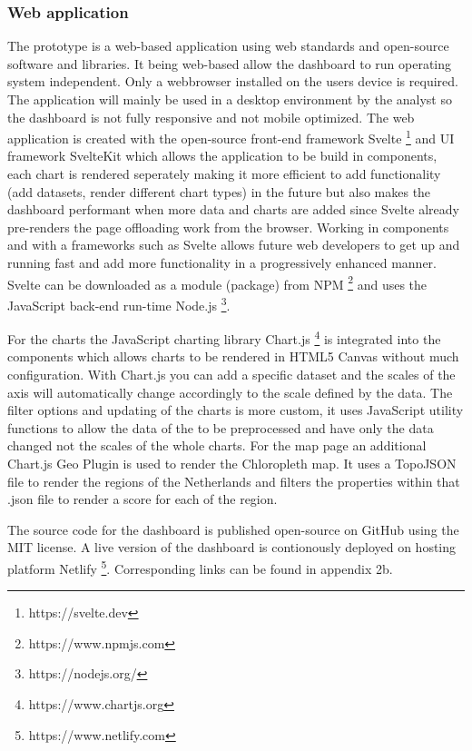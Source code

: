 \subsubsection{Web application}\hfill
The prototype is a web-based application using web standards and open-source software and libraries. It being web-based allow the dashboard to run operating system independent. Only a webbrowser installed on the users device is required. The application will mainly be used in a desktop environment by the analyst so the dashboard is not fully responsive and not mobile optimized. The web application is created with the open-source front-end framework Svelte \footnote{https://svelte.dev} and UI framework SvelteKit which allows the application to be build in components, each chart is rendered seperately making it more efficient to add functionality (add datasets, render different chart types) in the future but also makes the dashboard performant when more data and charts are added since Svelte already pre-renders the page offloading work from the browser. Working in components and with a frameworks such as Svelte allows future web developers to get up and running fast and add more functionality in a progressively enhanced manner. Svelte can be downloaded as a module (package) from NPM \footnote{https://www.npmjs.com} and uses the JavaScript back-end run-time Node.js \footnote{https://nodejs.org/}. 

For the charts the JavaScript charting library Chart.js \footnote{https://www.chartjs.org} is integrated into the components which allows charts to be rendered in HTML5 Canvas without much configuration. With Chart.js you can add a specific dataset and the scales of the axis will automatically change accordingly to the scale defined by the data. The filter options and updating of the charts is more custom, it uses JavaScript utility functions to allow the data of the to be preprocessed and have only the data changed not the scales of the whole charts. For the map page an additional Chart.js Geo Plugin is used to render the Chloropleth map. It uses a TopoJSON file to render the regions of the Netherlands and filters the properties within that .json file to render a score for each of the region.

The source code for the dashboard is published open-source on GitHub using the MIT license. A live version of the dashboard is contionously deployed on hosting platform Netlify \footnote{https://www.netlify.com}. Corresponding links can be found in appendix 2b.


